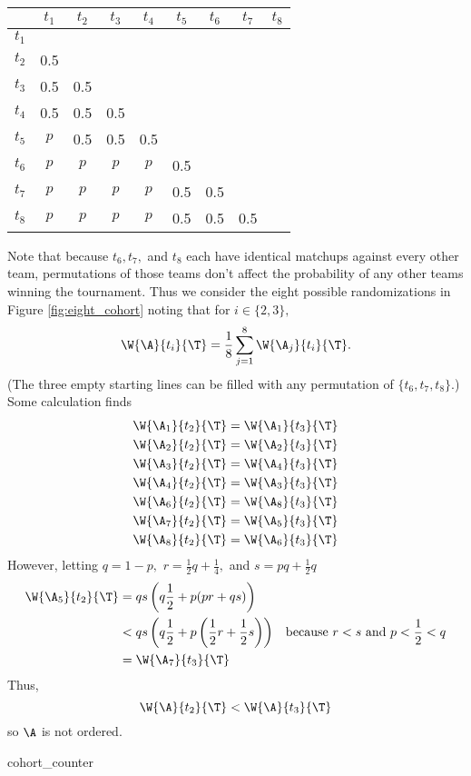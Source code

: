 {{        \begin{center}
            \begin{tabular}{c | c c c c c c c c}
    & $t_1$ & $t_2$ & $t_3$ & $t_4$ & $t_5$ & $t_6$ & $t_7$ & $t_8$\\ 
    \hline
    $t_1$ &  &  &  & & & & &\\
    $t_2$ & 0.5 &  &  &  & & & &\\
    $t_3$ & 0.5 & 0.5 &  &  &  & & &\\
    $t_4$ & 0.5 & 0.5 & 0.5 &  &  & & &\\
    $t_5$ & $p$ & 0.5 & 0.5 & 0.5 & & & &\\
    $t_6$ &  $p$&$p$  & $p$ &  $p$& 0.5 & & &\\
    $t_7$ & $p$ &  $p$& $p$ & $p$ & 0.5 &0.5 & &\\
    $t_8$ & $p$ &  $p$& $p$ & $p$ & 0.5 &0.5 &0.5 &\\
                \end{tabular}
        \end{center}

        Note that because $t_6, t_7,$ and $t_8$ each have identical matchups against every other team, permutations of those teams don't affect the probability of any other teams winning the tournament. Thus we consider the eight possible randomizations in Figure \ref{fig:eight_cohort} noting that for $i \in \{2, 3\},$
        $$\W{\A}{t_i}{\T} = \frac{1}{8}\sum_{j = 1}^8 \W{\A_j}{t_i}{\T}.$$
        (The three empty starting lines can be filled with any permutation of $\{t_6, t_7, t_8\}.$)\\

        Some calculation finds
        \begin{align*}
            \W{\A_1}{t_2}{\T} &= \W{\A_1}{t_3}{\T}\\
            \W{\A_2}{t_2}{\T} &= \W{\A_2}{t_3}{\T}\\
            \W{\A_3}{t_2}{\T} &= \W{\A_4}{t_3}{\T}\\
            \W{\A_4}{t_2}{\T} &= \W{\A_3}{t_3}{\T}\\
            \W{\A_6}{t_2}{\T} &= \W{\A_8}{t_3}{\T}\\
            \W{\A_7}{t_2}{\T} &= \W{\A_5}{t_3}{\T}\\
            \W{\A_8}{t_2}{\T} &= \W{\A_6}{t_3}{\T}
        \end{align*}
        However, letting $q = 1- p,$ $r = \frac{1}{2}q + \frac{1}{4},$ and $s = pq + \frac{1}{2}q$
        \begin{align*}
            \W{\A_5}{t_2}{\T} &= qs\left(q\frac{1}{2}+p(pr + qs)\right)\\
            &<qs\left(q\frac{1}{2}+p\left(\frac{1}{2}r + \frac{1}{2}s\right)\right) &\textrm{because $r < s$ and $p < \frac{1}{2} < q$}\\
            &=\W{\A_7}{t_3}{\T} 
        \end{align*}
        Thus, $$\W{\A}{t_2}{\T} < \W{\A}{t_3}{\T}$$ so $\A$ is not ordered.
    }{cohort_counter}

}
